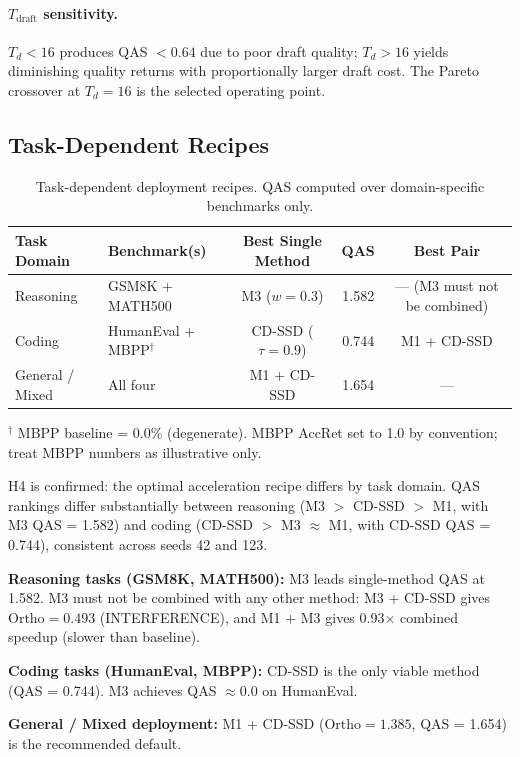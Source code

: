 \documentclass{article}
\newcommand{\ortho}{\text{Ortho}}
\newcommand{\Tdraft}{T_{\text{draft}}}
\begin{document}
\paragraph{$\Tdraft$ sensitivity.} $T_d < 16$ produces QAS $< 0.64$ due to poor draft quality;
$T_d > 16$ yields diminishing quality returns with proportionally larger draft cost. The Pareto
crossover at $T_d = 16$ is the selected operating point.

\subsection{Task-Dependent Recipes}
\label{sec:recipes}

\begin{table}[t]
\caption{Task-dependent deployment recipes. QAS computed over domain-specific benchmarks only.}
\label{tab:recipes}
\centering
\small
\begin{tabular}{llccc}
\toprule
\textbf{Task Domain} & \textbf{Benchmark(s)} & \textbf{Best Single Method} & \textbf{QAS}
  & \textbf{Best Pair} \\
\midrule
Reasoning & GSM8K + MATH500 & M3 ($w=0.3$) & 1.582 & --- (M3 must not be combined) \\
Coding & HumanEval + MBPP$^\dagger$ & CD-SSD ($\tau=0.9$) & 0.744 & M1 + CD-SSD \\
General / Mixed & All four & M1 + CD-SSD & 1.654 & --- \\
\bottomrule
\end{tabular}
{\small $^\dagger$ MBPP baseline = 0.0\% (degenerate). MBPP AccRet set to 1.0 by convention;
treat MBPP numbers as illustrative only.}
\end{table}

H4 is confirmed: the optimal acceleration recipe differs by task domain. QAS rankings differ
substantially between reasoning (M3 $>$ CD-SSD $>$ M1, with M3 QAS = 1.582) and coding (CD-SSD $>$ M3
$\approx$ M1, with CD-SSD QAS = 0.744), consistent across seeds 42 and 123.

\textbf{Reasoning tasks (GSM8K, MATH500):} M3 leads single-method QAS at 1.582. M3 must not be
combined with any other method: M3 + CD-SSD gives $\ortho = 0.493$ (INTERFERENCE), and M1 + M3
gives 0.93$\times$ combined speedup (slower than baseline).

\textbf{Coding tasks (HumanEval, MBPP):} CD-SSD is the only viable method (QAS = 0.744). M3
achieves QAS $\approx 0.0$ on HumanEval.

\textbf{General / Mixed deployment:} M1 + CD-SSD ($\ortho = 1.385$, QAS = 1.654) is the
recommended default.
\end{document}

